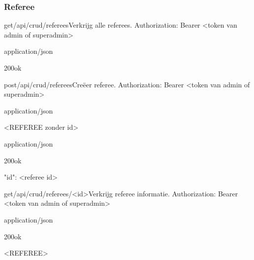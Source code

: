 \documentclass[10pt]{article}
\begin{document}
\clearpage
\subsubsection{Referee}

\begin{apiRoute}{get}{/api/crud/referees}{Verkrijg alle referees.}
 Authorization: Bearer <token van admin of superadmin>
	\begin{routeResponse}{application/json}
		\begin{routeResponseItem}{200}{ok}
			\begin{routeResponseItemBody}
[
	<REFEREE>, ...
]
\end{routeResponseItemBody}
		\end{routeResponseItem}
	\end{routeResponse}
\end{apiRoute}

\begin{apiRoute}{post}{/api/crud/referees}{Creëer referee.}
 Authorization: Bearer <token van admin of superadmin>
	\begin{routeRequest}{application/json}
		\begin{routeRequestBody}
<REFEREE zonder id>
		\end{routeRequestBody}
	\end{routeRequest}

	\begin{routeResponse}{application/json}
		\begin{routeResponseItem}{200}{ok}
			\begin{routeResponseItemBody}
{
	"id": <referee id>
}
			\end{routeResponseItemBody}
		\end{routeResponseItem}
	\end{routeResponse}
\end{apiRoute}

\begin{apiRoute}{get}{/api/crud/referees/<id>}{Verkrijg referee informatie.}
 Authorization: Bearer <token van admin of superadmin>
	\begin{routeParameter}
	\end{routeParameter}

	\begin{routeResponse}{application/json}
		\begin{routeResponseItem}{200}{ok}
			\begin{routeResponseItemBody}
<REFEREE>
			\end{routeResponseItemBody}
		\end{routeResponseItem}
	\end{routeResponse}
\end{apiRoute}
\end{document}

